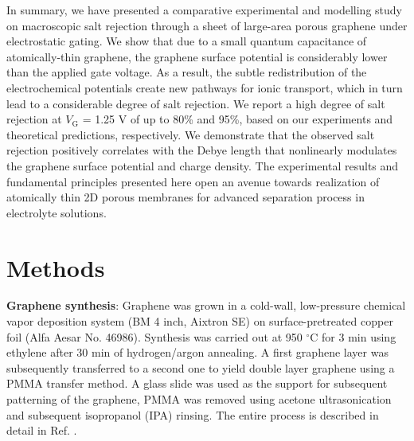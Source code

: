 \documentclass[journal=langd5,email=true, hyperref=true, keywords=false]{achemso}
\begin{document}
In summary, we have presented a comparative experimental and modelling
study on macroscopic salt rejection through a sheet of large-area
porous graphene under electrostatic gating. We show that due to a
small quantum capacitance of atomically-thin graphene, the graphene
surface potential is considerably lower than the applied gate
voltage. As a result, the subtle redistribution of the electrochemical
potentials create new pathways for ionic transport, which in turn lead
to a considerable degree of salt rejection. We report a high degree of
salt rejection at $V_{\mathrm{G}}$ = 1.25 V of up to 80\% and 95\%,
based on our experiments and theoretical predictions, respectively. We
demonstrate that the observed salt rejection positively correlates
with the Debye length that nonlinearly modulates the graphene surface
potential and charge density. The experimental results and fundamental
principles presented here open an avenue towards realization of
atomically thin 2D porous membranes for advanced separation process in
electrolyte solutions.

\section{Methods}
\label{sec:methods}

\textbf{Graphene synthesis}: Graphene was grown in a cold-wall,
low-pressure chemical vapor deposition system (BM 4 inch, Aixtron SE)
on surface-pretreated copper foil (Alfa Aesar No. 46986). Synthesis was
carried out at 950 $^{\circ}$C for 3 min using ethylene after 30 min of
hydrogen/argon annealing. A first graphene layer was subsequently
transferred to a second one to yield double layer graphene using a
PMMA transfer method. A glass slide was used as the support for
subsequent patterning of the graphene, PMMA was removed using acetone
ultrasonication and subsequent isopropanol (IPA) rinsing. The entire
process is described in detail in Ref. .
\end{document}
